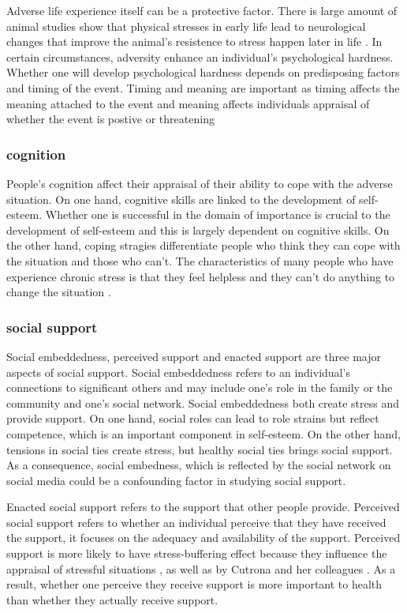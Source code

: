 Adverse life experience itself can be a protective factor. There is large amount of animal studies show that physical stresses in early life lead to neurological changes that improve the animal's resistence to stress happen later in life \cite{hennessy1979stress}. In certain circumstances, adversity enhance an individual's psychological hardness. Whether one will develop psychological hardness depends on predisposing factors and timing of the event. Timing and meaning are important as timing affects the meaning attached to the event and meaning affects individuals appraisal of whether the event is postive or threatening \cite{rutter1985resilience}

\subsubsection{cognition}
People's cognition affect their appraisal of their ability to cope with the adverse situation. On one hand, cognitive skills are linked to the development of self-esteem. Whether one is successful in the domain of importance is crucial to the development of self-esteem and this is largely dependent on cognitive skills. On the other hand, coping stragies differentiate people who think they can cope with the situation and those who can't. The characteristics of many people who have experience chronic stress is that they feel helpless and they can't do anything to change the situation \cite{rutter1985resilience}. 


\subsubsection{social support}

Social embeddedness, perceived support and enacted support are three major aspects of social support. Social embeddedness refers to an individual's connections to significant others and may include one's role in the family or the community and one's social network. Social embeddedness both create stress and provide support. On one hand, social roles can lead to role strains but reflect competence, which is an important component in self-esteem. On the other hand, tensions in social ties create stress, but healthy social ties brings social support. As a consequence, social embedness, which is reflected by the social network on social media could be a confounding factor in studying social support. 

Enacted social support refers to the support that other people provide. Perceived social support refers to whether an individual perceive that they have received the support, it focuses on the adequacy and availability of the support.  Perceived support is more likely to have stress-buffering effect because they influence the appraisal of stressful situations \cite{cohen1984social}, as well as by Cutrona and her colleagues \cite{cutrona1990type}. As a result, whether one perceive they receive support is more important to health than whether they actually receive support. 


